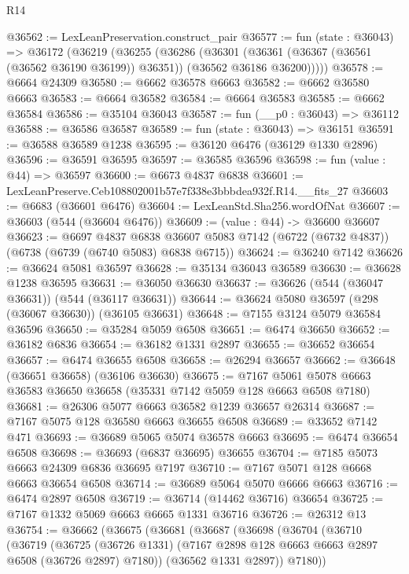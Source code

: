 \begin{lexlean}{R14}
\begin{coremodule}
@36562 := LexLeanPreservation.construct_pair
@36577 := fun (state : @36043) =>
  @36172
    (@36219
      (@36255
        (@36286
          (@36301
            (@36361 (@36367 (@36561 (@36562 @36190 @36199)) @36351))
            (@36562 @36186 @36200)))))
@36578 := @6664 @24309
@36580 := @6662 @36578 @6663
@36582 := @6662 @36580 @6663
@36583 := @6664 @36582
@36584 := @6664 @36583
@36585 := @6662 @36584
@36586 := @35104 @36043
@36587 := fun (__p0 : @36043) => @36112
@36588 := @36586 @36587
@36589 := fun (state : @36043) => @36151
@36591 := @36588 @36589 @1238
@36595 := @36120 @6476 (@36129 @1330 @2896)
@36596 := @36591 @36595
@36597 := @36585 @36596
@36598 := fun (value : @44) => @36597
@36600 := @6673 @4837 @6838
@36601 := LexLeanPreserve.Ceb108802001b57e7f338e3bbbdea932f.R14.__fits_27
@36603 := @6683 (@36601 @6476)
@36604 := LexLeanStd.Sha256.wordOfNat
@36607 := @36603 (@544 (@36604 @6476))
@36609 := (value : @44) -> @36600 @36607
@36623 := @6697
    @4837
    @6838
    @36607
    @5083
    @7142
    (@6722 (@6732 @4837))
    (@6738 (@6739 (@6740 @5083) @6838 @6715))
@36624 := @36240 @7142
@36626 := @36624 @5081 @36597
@36628 := @35134 @36043 @36589
@36630 := @36628 @1238 @36595
@36631 := @36050 @36630
@36637 := @36626 (@544 (@36047 @36631)) (@544 (@36117 @36631))
@36644 := @36624 @5080 @36597 (@298 (@36067 @36630)) (@36105 @36631)
@36648 := @7155 @3124 @5079 @36584 @36596
@36650 := @35284 @5059 @6508
@36651 := @6474 @36650
@36652 := @36182 @6836
@36654 := @36182 @1331 @2897
@36655 := @36652 @36654
@36657 := @6474 @36655 @6508
@36658 := @26294 @36657
@36662 := @36648 (@36651 @36658) (@36106 @36630)
@36675 := @7167 @5061 @5078 @6663 @36583 @36650 @36658 (@35331 @7142 @5059 @128 @6663 @6508 @7180)
@36681 := @26306 @5077 @6663 @36582 @1239 @36657 @26314
@36687 := @7167 @5075 @128 @36580 @6663 @36655 @6508
@36689 := @33652 @7142 @471
@36693 := @36689 @5065 @5074 @36578 @6663
@36695 := @6474 @36654 @6508
@36698 := @36693 (@6837 @36695) @36655
@36704 := @7185 @5073 @6663 @24309 @6836 @36695 @7197
@36710 := @7167 @5071 @128 @6668 @6663 @36654 @6508
@36714 := @36689 @5064 @5070 @6666 @6663
@36716 := @6474 @2897 @6508
@36719 := @36714 (@14462 @36716) @36654
@36725 := @7167 @1332 @5069 @6663 @6665 @1331 @36716
@36726 := @26312 @13
@36754 := @36662
    (@36675
      (@36681
        (@36687
          (@36698
            (@36704
              (@36710
                (@36719
                  (@36725
                    (@36726 @1331)
                    (@7167 @2898 @128 @6663 @6663 @2897 @6508 (@36726 @2897) @7180))
                  (@36562 @1331 @2897))
                @7180))

\end{coremodule}
\end{lexlean}
